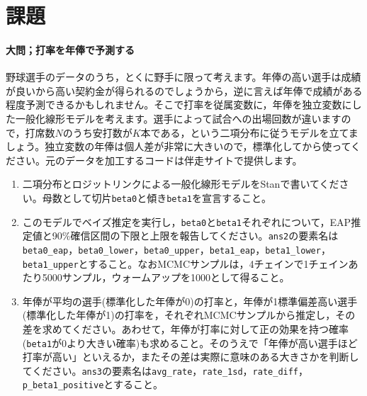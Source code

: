 \documentclass{ltjsbook}
\begin{document}
\section{課題}


\paragraph{大問；打率を年俸で予測する}
野球選手のデータのうち，とくに野手に限って考えます。年俸の高い選手は成績が良いから高い契約金が得られるのでしょうから，逆に言えば年俸で成績がある程度予測できるかもしれません。そこで打率を従属変数に，年俸を独立変数にした一般化線形モデルを考えます。選手によって試合への出場回数が違いますので，打席数$N$のうち安打数が$K$本である，という二項分布に従うモデルを立てましょう。独立変数の年俸は個人差が非常に大きいので，標準化してから使ってください。元のデータを加工するコードは伴走サイトで提供します。
\begin{enumerate}
	\item 二項分布とロジットリンクによる一般化線形モデルをStanで書いてください。母数として切片\verb|beta0|と傾き\verb|beta1|を宣言すること。
	\item このモデルでベイズ推定を実行し，\verb|beta0|と\verb|beta1|それぞれについて，EAP推定値と90\%確信区間の下限と上限を報告してください。\verb|ans2|の要素名は\verb|beta0_eap|，\verb|beta0_lower|，\verb|beta0_upper|，\verb|beta1_eap|，\verb|beta1_lower|，\verb|beta1_upper|とすること。なおMCMCサンプルは，4チェインで1チェインあたり5000サンプル，ウォームアップを1000として得ること。
	\item 年俸が平均の選手(標準化した年俸が0)の打率と，年俸が1標準偏差高い選手(標準化した年俸が1)の打率を，それぞれMCMCサンプルから推定し，その差を求めてください。あわせて，年俸が打率に対して正の効果を持つ確率(\verb|beta1|が0より大きい確率)も求めること。そのうえで「年俸が高い選手ほど打率が高い」といえるか，またその差は実際に意味のある大きさかを判断してください。\verb|ans3|の要素名は\verb|avg_rate|，\verb|rate_1sd|，\verb|rate_diff|，\verb|p_beta1_positive|とすること。
\end{enumerate}
\end{document}
